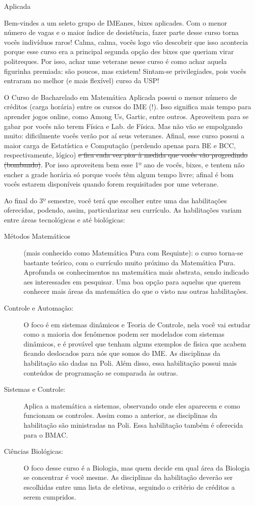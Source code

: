 \begin{subsecao}{Aplicada}

Bem-vindes a um seleto grupo de IMEanes, bixes aplicades. Com o menor número de
vagas e o maior índice de desistência, fazer parte desse curso torna vocês
indivíduos raros!  Calma, calma, vocês logo vão descobrir que isso acontecia
porque esse curso era a principal segunda opção des bixes que queriam virar
politreques. Por isso, achar ume veterane nesse curso é como achar aquela
figurinha premiada: são poucos, mas existem! Sintam-se privilegiades, pois vocês
entraram no melhor (e mais flexível) curso da USP!

O Curso de Bacharelado em Matemática Aplicada possui o menor número de créditos
(carga horária) entre os cursos do IME (!). Isso significa mais tempo para
aprender jogos online, como Among Us, Gartic, entre outros. Aproveitem para se gabar 
por vocês não terem Física e Lab. de Física. Mas não vão se empolgando muito: 
dificilmente vocês verão por aí seus veteranes. Afinal, esse curso possui a maior carga 
de Estatística e Computação (perdendo apenas para BE e BCC, respectivamente, lógico) 
\sout{e fica cada vez pior à medida que vocês vão progredindo (bombando)}. 
Por isso aproveitem bem esse 1º ano de vocês, bixes, e tentem não encher a grade
horária só porque vocês têm algum tempo livre; afinal é bom vocês estarem
disponíveis quando forem requisitades por ume veterane.

Ao final do 3º semestre, você terá que escolher entre uma das habilitações
oferecidas, podendo, assim, particularizar seu currículo. As habilitações variam
entre áreas tecnológicas e até biológicas:
\begin{description}
\item [Métodos Matemáticos] (mais conhecido como Matemática Pura com Requinte):
  o curso torna-se bastante teórico, com o currículo muito próximo da Matemática
  Pura. Aprofunda os conhecimentos na matemática mais abstrata, sendo indicado
  aes interessades em pesquisar. Uma boa opção para aquelus que querem conhecer
  mais áreas da matemática do que o visto nas outras habilitações.
\item [Controle e Automação:]  O foco é em sistemas dinâmicos e Teoria de
  Controle, nela você vai estudar como a maioria dos fenômenos podem ser
  modelados com sistemas dinâmicos, e é provável que tenham alguns exemplos de
  física que acabem ficando deslocados para nós que somos do IME. As disciplinas
  da habilitação são dadas na Poli. Além disso, essa habilitação possui mais
  conteúdos de programação se comparada às outras.
\item [Sistemas e Controle:] Aplica a matemática a sistemas, observando onde
  eles aparecem e como funcionam os controles. Assim como a anterior, as
  disciplinas da habilitação são ministradas na Poli. Essa habilitação também é
  oferecida para o BMAC.
\item [Ciências Biológicas:] O foco desse curso é a Biologia, mas quem decide em
  qual área da Biologia se concentrar é você mesme. As disciplinas da
  habilitação deverão ser escolhidas entre uma lista de eletivas, seguindo o
  critério de créditos a serem cumpridos.
\end{description}


\end{subsecao}
